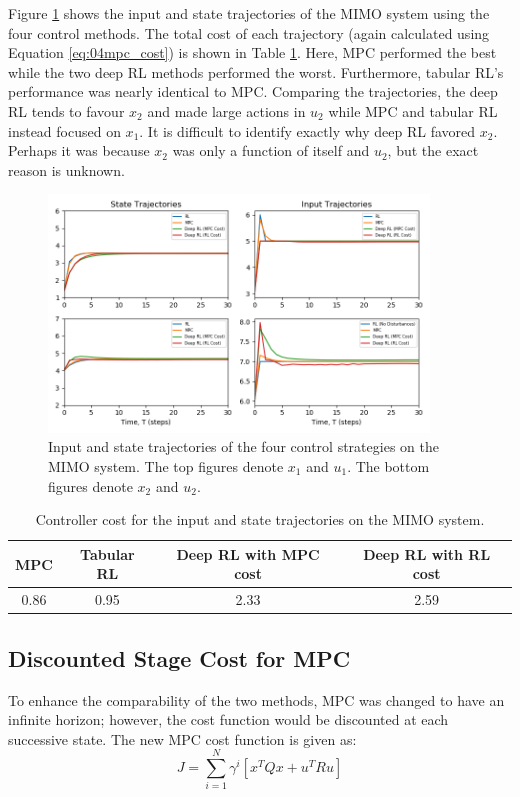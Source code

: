 Figure \ref{fig:04MIMOcomp} shows the input and state trajectories of the MIMO system using the four control methods.  The total cost of each trajectory (again calculated using Equation \ref{eq:04mpc_cost}) is shown in Table \ref{tab:04MIMOCost}. Here, MPC performed the best while the two deep RL methods performed the worst. Furthermore, tabular RL's performance was nearly identical to MPC. Comparing the trajectories, the deep RL tends to favour $x_2$ and made large actions in $u_2$ while MPC and tabular RL instead focused on $x_1$.  It is difficult to identify exactly why deep RL favored $x_2$.
Perhaps it was because $x_2$ was only a function of itself and $u_2$, but the exact reason is unknown.
\begin{figure}[H]
    \centering
    \includegraphics[width=0.9\textwidth]{images/ch4/State_and_Input_MIMO3.png}
    \caption{Input and state trajectories of the four control strategies on the MIMO system. The top figures denote $x_1$ and $u_1$.  The bottom figures denote $x_2$ and $u_2$.}
    \label{fig:04MIMOcomp}
\end{figure}

\begin{table}[H]
\caption{Controller cost for the input and state trajectories on the MIMO system.}
\label{tab:04MIMOCost}
\centering
\begin{tabular}{c|c|c|c}
\textbf{MPC} & \textbf{Tabular RL} & \textbf{Deep RL with MPC cost}& \textbf{Deep RL with RL cost} \\
\hline
0.86	     & 0.95	               & 2.33                         & 2.59	 \\
\end{tabular}
\end{table}

\subsection{Discounted Stage Cost for MPC}
To enhance the comparability of the two methods, MPC was changed to have an infinite horizon; however, the cost function would be discounted at each successive state.  The new MPC cost function is given as:
\begin{equation}
    J = \sum^{N}_{i = 1} \gamma^i[x^TQx + u^TRu]
    \label{eq:04disc_mpc}
\end{equation}

